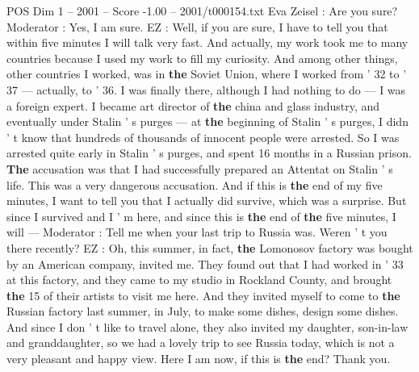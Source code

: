 \begin{textsample}{POS Dim 1 – 2001 – Score -1.00 – 2001/t000154.txt}
Eva Zeisel : Are you sure?
Moderator : Yes, I am sure.
EZ : Well, if you are sure, I have to tell you that within five minutes I will talk very fast.
And actually, my work took me to many countries because I used my work to fill my curiosity.
And among other things, other countries I worked, was in \textbf{the} Soviet Union, where I worked from ' 32 to ' 37 — actually, to ' 36.
I was finally there, although I had nothing to do — I was a foreign expert.
I became art director of \textbf{the} china and glass industry, and eventually under Stalin ' s purges — at \textbf{the} beginning of Stalin ' s purges, I didn ' t know that hundreds of thousands of innocent people were arrested.
So I was arrested quite early in Stalin ' s purges, and spent 16 months in a Russian prison. \textbf{The} accusation was that I had successfully prepared an Attentat on Stalin ' s life.
This was a very dangerous accusation.
And if this is \textbf{the} end of my five minutes, I want to tell you that I actually did survive, which was a surprise.
But since I survived and I ' m here, and since this is \textbf{the} end of \textbf{the} five minutes, I will — Moderator : Tell me when your last trip to Russia was.
Weren ' t you there recently?
EZ : Oh, this summer, in fact, \textbf{the} Lomonosov factory was bought by an American company, invited me.
They found out that I had worked in ' 33 at this factory, and they came to my studio in Rockland County, and brought \textbf{the} 15 of their artists to visit me here.
And they invited myself to come to \textbf{the} Russian factory last summer, in July, to make some dishes, design some dishes.
And since I don ' t like to travel alone, they also invited my daughter, son-in-law and granddaughter, so we had a lovely trip to see Russia today, which is not a very pleasant and happy view.
Here I am now, if this is \textbf{the} end?
Thank you.

\end{textsample}
